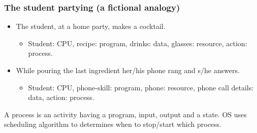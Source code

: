   \begin{frame}
    \frametitle{The student partying (a fictional analogy)}
        \begin{itemize}
          \item The student, at a home party, makes a cocktail.
          \begin{itemize}
            \item Student: CPU, recipe: program, drinks: data, glasses: resource, action: process.
          \end{itemize}
          \item While pouring the last ingredient her/his phone rang and s/he answers.
          \begin{itemize}
            \item Student: CPU, phone-skill: program, phone: resource, phone call details: data, action: process.
          \end{itemize}
        \end{itemize}
	A process is an activity having a program, input, output and a state. OS uses scheduling algorithm to determines when to stop/start which process.
  \end{frame}

